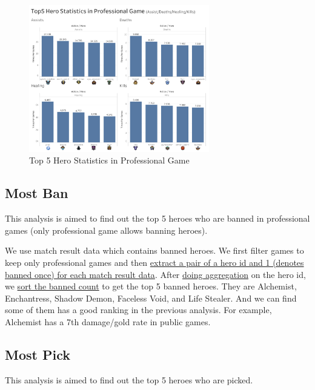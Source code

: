\documentclass{article}
\begin{document}
\begin{figure}[H]
\centering
\includegraphics[width=0.7\textwidth]{pic/ProStat.png}
\caption{Top 5 Hero Statistics in Professional Game}
\label{Top 5 Hero Statistics in Professional Game}
\end{figure}

\subsection{Most Ban}

This analysis is aimed to find out the top 5 heroes who are banned in professional games (only professional game allows banning heroes).

We use match result data which contains banned heroes. We first filter games to keep only professional games and then \href{https://github.com/Vopaaz/big-data-psg-lgd/blob/master/src/main/scala/MostBan.scala#L29-L30}{extract a pair of a hero id and 1 (denotes banned once) for each match result data}. After \href{https://github.com/Vopaaz/big-data-psg-lgd/blob/master/src/main/scala/MostBan.scala#L31}{doing aggregation} on the hero id, we \href{https://github.com/Vopaaz/big-data-psg-lgd/blob/master/src/main/scala/MostBan.scala#L33}{sort the banned count} to get the top 5 banned heroes. They are Alchemist, Enchantress, Shadow Demon, Faceless Void, and Life Stealer. And we can find some of them has a good ranking in the previous analysis. For example, Alchemist has a 7th damage/gold rate in public games.

\subsection{Most Pick}

This analysis is aimed to find out the top 5 heroes who are picked.
\end{document}
